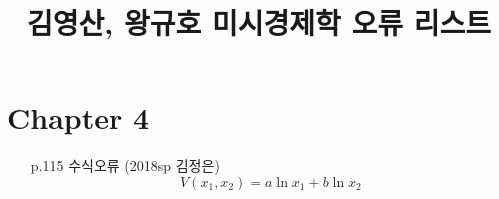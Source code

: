 \documentclass[a4paper,11pt]{article}
\title{김영산, 왕규호 미시경제학 오류 리스트}
\begin{document}
\maketitle

\section{Chapter 4} %

\label{sec:ch4}
\begin{itemize}
	\item [p.115] 수식오류 (2018sp 김정은)
	\[
		V(x_1,x_2)=a \ln x_1 + b\ln x_2
	\]
\end{itemize}
\end{document}
